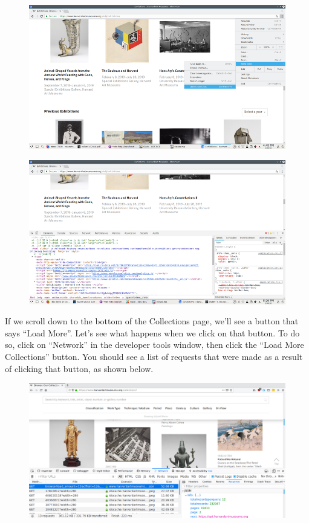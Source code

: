 \documentclass[]{book}
\begin{document}
\begin{figure}
\centering
\includegraphics{Python/PythonWebScrape/images/dev_tools.png}
\caption{}
\end{figure}

\begin{figure}
\centering
\includegraphics{Python/PythonWebScrape/images/dev_tools_pane.png}
\caption{}
\end{figure}

If we scroll down to the bottom of the Collections page, we'll see a
button that says ``Load More''. Let's see what happens when we click on
that button. To do so, click on ``Network'' in the developer tools
window, then click the ``Load More Collections'' button. You should see
a list of requests that were made as a result of clicking that button,
as shown below.

\begin{figure}
\centering
\includegraphics{Python/PythonWebScrape/images/dev_tools_network.png}
\caption{}
\end{figure}
\end{document}
